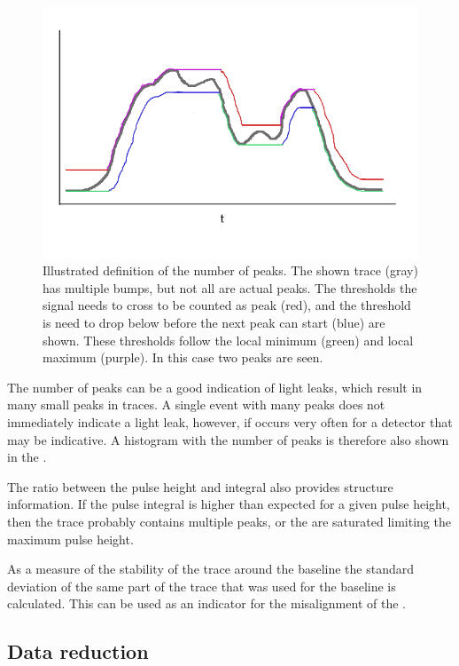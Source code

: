 \begin{figure}
    \centering
    \includegraphics[width=0.7\linewidth]{plots/processing/n_peaks}
    \caption{Illustrated definition of the number of peaks. The shown trace (gray) has multiple bumps, but not all are actual peaks. The thresholds the signal needs to cross to be counted as peak (red), and the threshold is need to drop below before the next peak can start (blue) are shown. These thresholds follow the local minimum (green) and local maximum (purple). In this case two peaks are seen.}
    \label{fig:n_peaks}
\end{figure}

The number of peaks can be a good indication of light leaks, which result in many small peaks in traces. A single event with many peaks does not immediately indicate a light leak, however, if occurs very often for a detector that may be indicative. A histogram with the number of peaks is therefore also shown in the \hisparc \daq.

The ratio between the pulse height and integral also provides structure information. If the pulse integral is higher than expected for a given pulse height, then the trace probably contains multiple peaks, or the \adcs are saturated limiting the maximum pulse height.

As a measure of the stability of the trace around the baseline the standard deviation of the same part of the trace that was used for the baseline is calculated. This can be used as an indicator for the misalignment of the \adcs.


\subsection{Data reduction}

